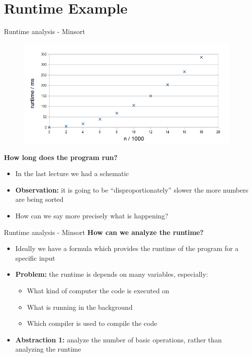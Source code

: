 \section{Runtime Example}



\begin{frame}{Runtime analysis - Minsort}
  \vspace{-1em}
  \begin{figure}[!h]
    \includegraphics[width=0.75\linewidth]{Images/MinSort/Minsort.png}
    \label{fig:introduction:minsort_runtime}
  \end{figure}
  \vspace{-0.5em}
  \textbf{How long does the program run?}
  \begin{itemize}
    \item<2- |handout:1>
      In the last lecture we had a schematic
    \item<2- |handout:1>
      \textbf{Observation:} it is going to be \enquote{disproportionately} slower
      the more numbers are being sorted
    \item<3- |handout:1>
      How can we say more precisely what is happening?
  \end{itemize}
\end{frame}


\begin{frame}{Runtime analysis - Minsort}
  \textbf{How can we analyze the runtime?}
  \begin{itemize}
    \item<1- |handout:1>
      Ideally we have a formula which provides the runtime of the program for
      a specific input
    \item<2- |handout:1>
      \textbf{Problem:}
      the runtime is depends on many variables, especially:
      \begin{itemize}
        \item
          What kind of computer the code is executed on
        \item What is running in the background
        \item Which compiler is used to compile the code
      \end{itemize}
    \item<3- |handout:1>
      \textbf{Abstraction 1:}
      analyze the number of basic operations, rather than analyzing the runtime
  \end{itemize}
\end{frame}
